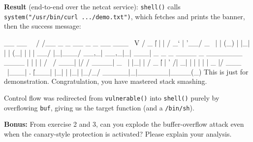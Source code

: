 \documentclass[a4paper, 10pt]{article}
\begin{document}
\begin{solution}
	\noindent \textbf{Result} (end-to-end over the netcat service): \texttt{shell()} calls
	\texttt{system("/usr/bin/curl .../demo.txt")}, which fetches and prints the banner, then the success
	message:

\begin{codingbox*}[numbers=none, xleftmargin=0pt, belowskip=6pt, basicstyle=\ttfamily\footnotesize\color{editortext}]
 __   __
 \ \ / /__  _   _    __ _ _ __ ___
  \ V / _ \| | | |  / _` | '__/ _ \
   | | (_) | |_| | | (_| | | |  __/
   |_|\___/ \__,_|  \__,_|_|  \___|
  _   _    _    ____ _  _______ ____
 | | | |  / \  / ___| |/ / ____|  _ \
 | |_| | / _ \| |   | ' /|  _| | | | |
 |  _  |/ ___ \ |___| . \| |___| |_| |
 |_| |_/_/   \_\____|_|\_\_____|____(_)
 This is just for demonstration.
 Congratulation, you have mastered stack smashing.
\end{codingbox*}

	\noindent Control flow was redirected from \texttt{vulnerable()} into \texttt{shell()} purely by
	overflowing \texttt{buf}, giving us the target function (and a \texttt{/bin/sh}).
\end{solution}


\newpage


\begin{problem}
\textbf{Bonus:} From exercise 2 and 3,
can you explode the buffer-overflow attack even when the canary-style protection is activated?
Please explain your analysis.
\end{problem}
\end{document}
